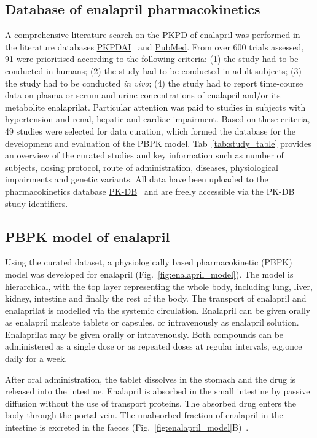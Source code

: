 \documentclass[pharmaceutics,article,submit,pdftex,moreauthors]{Definitions/mdpi}
\begin{document}
\subsection{Database of enalapril pharmacokinetics}
A comprehensive literature search on the PKPD of enalapril was performed in the literature databases \href{https://www.pkpdai.com/}{PKPDAI}~\cite{GonzalezHernandez2021} and \href{https://pubmed.ncbi.nlm.nih.gov/}{PubMed}. From over 600 trials assessed, 91 were prioritised according to the following criteria: (1) the study had to be conducted in humans; (2) the study had to be conducted in adult subjects; (3) the study had to be conducted \textit{in vivo}; (4) the study had to report time-course data on plasma or serum and urine concentrations of enalapril and/or its metabolite enalaprilat. Particular attention was paid to studies in subjects with hypertension and renal, hepatic and cardiac impairment. Based on these criteria, 49 studies were selected for data curation, which formed the database for the development and evaluation of the PBPK model. 
Tab~\ref{tab:study_table} provides an overview of the curated studies and key information such as number of subjects, dosing protocol, route of administration, diseases, physiological impairments and genetic variants. All data have been uploaded to the pharmacokinetics database \href{https://pk-db.com}{PK-DB}~\cite{Grzegorzewski2021} and are freely accessible via the PK-DB study identifiers.

\subsection{PBPK model of enalapril}\label{sec:results_model}
Using the curated dataset, a physiologically based pharmacokinetic (PBPK) model was developed for enalapril (Fig.~\ref{fig:enalapril_model}). The model is hierarchical, with the top layer representing the whole body, including lung, liver, kidney, intestine and finally the rest of the body. The transport of enalapril and enalaprilat is modelled via the systemic circulation. Enalapril can be given orally as enalapril maleate tablets or capsules, or intravenously as enalapril solution. Enalaprilat may be given orally or intravenously. Both compounds can be administered as a single dose or as repeated doses at regular intervals, e.g.\@ once daily for a week. 

After oral administration, the tablet dissolves in the stomach and the drug is released into the intestine. Enalapril is absorbed in the small intestine by passive diffusion without the use of transport proteins. The absorbed drug enters the body through the portal vein. The unabsorbed fraction of enalapril in the intestine is excreted in the faeces (Fig.~\ref{fig:enalapril_model}B)~\cite{Knutter2008, Smeets2020a, Smeets2020}.
\end{document}
